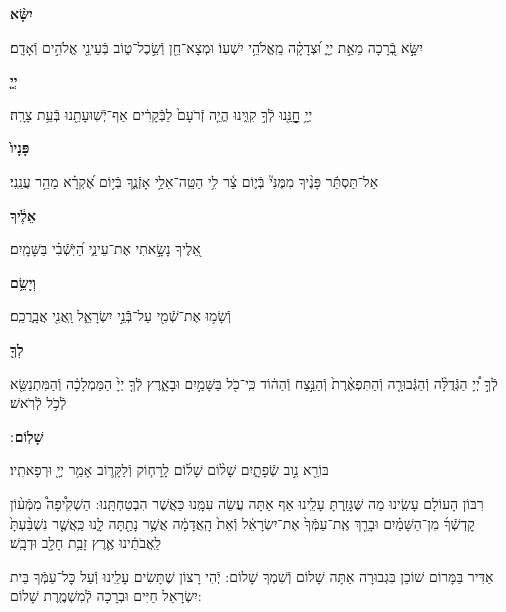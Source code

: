 \documentclass[twoside, openany, parskip=half, 11pt]{book}
\begin{document}
\begin{sometimes}
\textbf{יִשָּׂ֨א}
 \hfill \begin{footnotesize}
 יִשָּׂ֣א בְֿ֭רָכָה מֵאֵ֣ת יְיָ֑ וּ֝צְדָקָ֗ה מֵֽאֱלֹהֵ֥י יִשְׁעֽוֹ׃ וּמְצָא־חֵ֖ן וְֿשֵׂ֣כֶל־ט֑וֹב בְּֿעֵינֵ֖י אֱלֹהִ֣ים וְֿאָדָֽם׃\\
 \end{footnotesize}
\textbf{יְיָ֤}
 \hfill \begin{footnotesize}
 יְיָ֥ חׇׇׇׇׇׇׇׇָנֵּ֖נוּ לְֿךָ֣ קִוִּ֑ינוּ הֱיֵ֤ה זְֿרֹעָם֙ לַבְּֿקָרִ֔ים אַף־יְֿשֽׁוּעָתֵ֖נוּ בְּֿעֵ֥ת צָרָֽה׃\\
 \end{footnotesize}
\textbf{פָּנָיו֙}
 \hfill \begin{footnotesize}
 אַל־תַּסְתֵּ֬ר פָּנֶ֨יךָ מִמֶּנִּי֘ בְּֿי֢וֹם צַ֫ר לִ֥י הַטֵּֽה־אֵלַ֥י אָזְֿנֶ֑ךָ
 בְּֿי֥וֹם אֶ֝קְרָ֗א מַהֵ֥ר עֲנֵֽנִי׃\\
 \end{footnotesize}
\textbf{אֵלֶ֔יךָ}
 \hfill \begin{footnotesize}
 אֵ֭לֶיךָ נָשָׂ֣אתִי אֶת־עֵינַ֑י הַ֝יֹּֽשְֿׁבִ֗י בַּשָּׁמָֽיִם׃\\
 \end{footnotesize}
\textbf{וְיָשֵׂ֥ם}
 \hfill \begin{footnotesize}
 וְֿשָׂמ֥וּ אֶת־שְֿׁמִ֖י עַל־בְּֿֿנֵ֣י יִשְׂרָאֵ֑ל וַֽאֲנִ֖י אֲבָֽרֲכֵֽם׃\\
 \end{footnotesize}
\textbf{לְךָ֖}
 \hfill \begin{footnotesize}
 לְֿךָ֣ יְ֠יָ הַגְּֿדֻלָּ֨ה וְֿהַגְּֿבוּרָ֤ה וְֿהַתִּפְאֶ֨רֶת֙ וְֿהַנֵּ֣צַח וְֿהַה֔וֹד
 כִּֽי־כֹ֖ל בַּשָּׁמַ֣יִם וּבָאָ֑רֶץ לְֿךָ֤ יְיָ֙ הַמַּמְלָכָ֔ה וְֿהַמִּתְנַשֵּׂ֖א
 לְֿכֹ֥ל לְֿרֹֽאשׁ׃\\
 \end{footnotesize}
\textbf{שָׁלֽוֹם}
׃ \hfill \begin{footnotesize}
 בּוֹרֵ֖א נִ֣וב שְֿׂפָתָ֑יִם שָׁל֨וֹם שָׁל֜וֹם לָֽרָח֧וֹק וְֿלַקָּר֛וֹב
 אָמַ֥ר יְיָ֖ וּרְפָאתִֽיו׃
\end{footnotesize}

\clearpage

\begin{paracol}{2}
רִבּוֹן הָעוֹלָם עָשִֽׂינוּ מַה שֶּׁגָּזַֽרְתָּ עָלֵֽינוּ אַף אַתָּה עֲשֵׂה עִמָּֽנוּ כַּאֲשֶׁר הִבְטַחְתָּֽנוּ: הַשְׁקִ֩יפָה֩ מִמְּֿע֨וֹן קׇדְשְֿׁךָ֜ מִן־הַשָּׁמַ֗יִם וּבָרֵ֤ךְ אֶֽת־עַמְּֿךָ֙ אֶת־יִשְׂרָאֵ֔ל וְֿאֵת֙ הָֽאֲדָמָ֔ה אֲשֶׁ֥ר נָתַ֖תָּה לָ֑נוּ כַּֽאֲשֶׁ֤ר נִשְׁבַּ֨עְתָּ֙ לַֽאֲבֹתֵ֔ינוּ אֶ֛רֶץ זָבַ֥ת חָלָ֖ב וּדְבָֽשׁ׃

\switchcolumn

\kahal
אַדִּיר בַּמָּרוֹם שׁוֹכֵן בִּגְבוּרָה אַתָּה שָׁלוֹם וְֿשִׁמְךָ שָׁלוֹם: יְֿהִי רָצוֹן שֶׁתָּשִׂים עָלֵֽינוּ וְֿעַל כׇּל־עַמְּֿךָ בֵּית יִשְׂרָאֵל חַיִּים וּבְרָכָה לְֿמִשְׁמֶֽרֶת שָׁלוֹם:
\end{paracol}




\end{sometimes}
\end{document}
